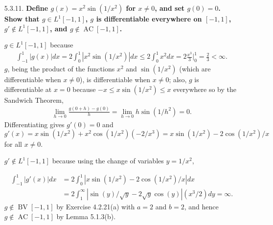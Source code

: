 \documentclass[a4paper,12pt]{article}
\DeclareMathOperator*{\BV}{BV}
\DeclareMathOperator*{\AC}{AC}
\begin{document}
\begin{enumerate}
    \item[5.3.11.]
        \boldmath\textbf{Define $g(x) = x^2\sin(1/x^2)$ for $x \neq 0$, and set $g(0) = 0$. Show that $g \in L^1[-1, 1]$, $g$ is differentiable everywhere on $[-1, 1]$, $g' \notin L^1[-1, 1]$, and $g \notin \AC[-1, 1]$.
        }\unboldmath \par
        $g \in L^1[-1, 1]$ because
        \begin{align*}
            \int_{-1}^1 |g(x)| dx = 2 \int_0^1 |x^2\sin(1/x^2)| dx \leq 2 \int_0^1 x^2 dx = 2 \frac{x^3}{3} \bigg|_0^1 = \frac{2}{3} < \infty.
        \end{align*}
        $g$, being the product of the functions $x^2$ and $\sin(1/x^2)$ (which are differentiable when $x \neq 0$), is differentiable when $x \neq 0$; also, $g$ is differentiable at $x = 0$ because $-x \leq x\sin(1/x^2) \leq x$ everywhere so by the Sandwich Theorem,
        \begin{align*}
            \lim_{h \to 0} \frac{g(0 + h) - g(0)}{h} = \lim_{h \to 0} h\sin(1/h^2) = 0.
        \end{align*}
        Differentiating gives $g'(0) = 0$ and $g'(x) = x\sin(1/x^2) + x^2\cos(1/x^2)(-2/x^3) = x\sin(1/x^2) - 2\cos(1/x^2)/x$ for all $x \neq 0$. \par
        $g' \notin L^1[-1, 1]$ because using the change of variables $y = 1/x^2$,
        \iffalse
            From the same reasoning as in Exercise 4.2.21(a) (on the previous homework), the Mean Value Theorem for (Riemann) Integrals states that the above quantity diverges if and only if
        \fi
        \begin{align*}
            \int_{-1}^1 |g'(x)| dx &= 2\int_0^1 |x\sin(1/x^2) - 2\cos(1/x^2)/x| dx \\
            &= 2\int_1^\infty |\sin(y)/\sqrt{y} - 2\sqrt{y}\cos(y)| (x^3/2)dy = \infty.
        \end{align*}
        $g \notin \BV[-1, 1]$ by Exercise 4.2.21(a) with $a = 2$ and $b = 2$, and hence $g \notin \AC[-1, 1]$ by Lemma 5.1.3(b).
\end{enumerate}
\end{document}
